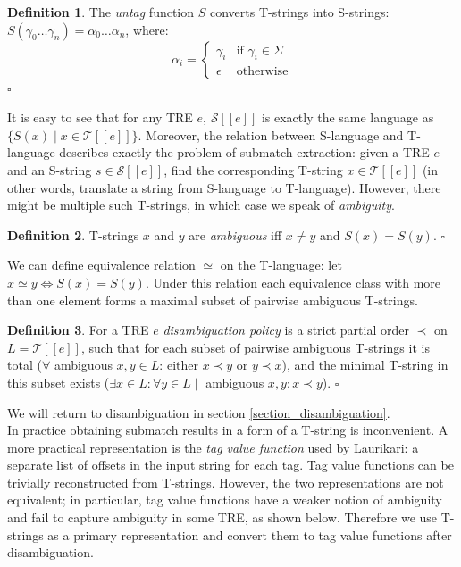 \documentclass{article}
\newcommand{\Xin}{\!\in\!}
\newcommand{\Xeq}{\!=\!}
\newcommand{\Xlb}{[\![}
\newcommand{\Xrb}{]\!]}
\newcommand{\XS}{\mathcal{S}}
\newcommand{\XT}{\mathcal{T}}
\theoremstyle{definition}
\newtheorem{Xdef}{Definition}
\begin{document}
\begin{multicols}{2}
    \begin{Xdef}\label{untag}
    The \emph{untag} function $S$ converts T-strings into S-strings:
    $S(\gamma_0 \dots \gamma_n) \Xeq \alpha_0 \dots \alpha_n$, where:
    $$\alpha_i = \begin{cases}
            \gamma_i &\text{if } \gamma_i \Xin \Sigma \\[-0.5em]
            \epsilon &\text{otherwise}
        \end{cases}$$
    $\square$
    \end{Xdef}

It is easy to see that for any TRE $e$, $\XS \Xlb e \Xrb$
is exactly the same language as $\{S(x) \mid x \Xin \XT \Xlb e \Xrb\}$.
Moreover, the relation between S-language and T-language
describes exactly the problem of submatch extraction:
given a TRE $e$ and an S-string $s \Xin \XS \Xlb e \Xrb$,
find the corresponding T-string $x \Xin \XT \Xlb e \Xrb$
(in other words, translate a string from S-language to T-language).
However, there might be multiple such T-strings, in which case we speak of \emph{ambiguity}.

    \begin{Xdef}
    T-strings $x$ and $y$ are \emph{ambiguous} iff $x \!\neq\! y$ and $S(x) \Xeq S(y)$.
    $\square$
    \end{Xdef}

We can define equivalence relation $\simeq$ on the T-language: let $x \simeq y \Leftrightarrow S(x) \Xeq S(y)$.
Under this relation each equivalence class with more than one element forms a maximal subset of pairwise ambiguous T-strings.

    \begin{Xdef}
    For a TRE $e$ \emph{disambiguation policy} is a strict partial order $\prec$ on $L \Xeq \XT \Xlb e \Xrb$, such that
    for each subset of pairwise ambiguous T-strings
    it is total ($\forall$ ambiguous $x, y \Xin L$: either $x \prec y$ or $y \prec x$),
    and the minimal T-string in this subset exists ($\exists x \Xin L: \forall y \Xin L \mid$ ambiguous $x, y: x \prec y$).
    $\square$
    \end{Xdef}

We will return to disambiguation in section \ref{section_disambiguation}.
\\

In practice obtaining submatch results in a form of a T-string is inconvenient.
A more practical representation is the \emph{tag value function} used by Laurikari: 
a separate list of offsets in the input string for each tag.
Tag value functions can be trivially reconstructed from T-strings.
However, the two representations are not equivalent;
in particular, tag value functions have a weaker notion of ambiguity and fail to capture ambiguity in some TRE, as shown below.
Therefore we use T-strings as a primary representation
and convert them to tag value functions after disambiguation.


\end{multicols}
\end{document}

